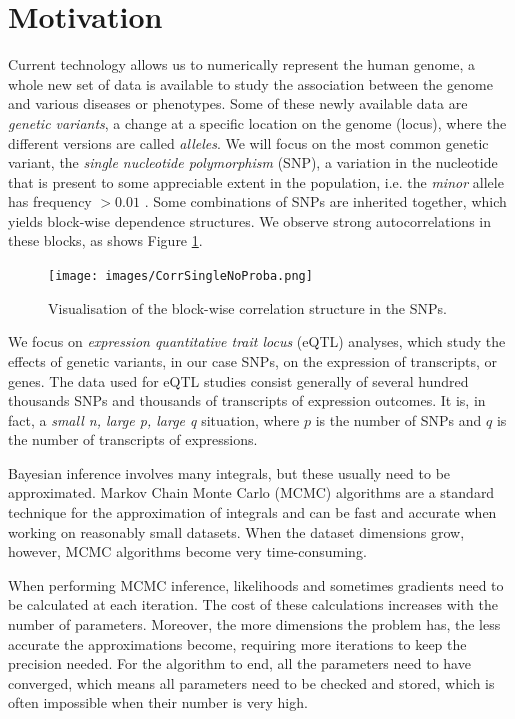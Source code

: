 \documentclass[a4paper, 11pt]{report}
\numberwithin{equation}{section}
\begin{document}
\section{Motivation}
Current technology allows us to numerically represent the human genome, a whole new set of data is available to study the association between the genome and various diseases or phenotypes.  Some of these newly available data are \textit{genetic variants}, a change at a specific location on  the genome (locus), where the different versions are called \textit{alleles}. We will focus on the most common genetic variant, the \textit{single nucleotide polymorphism} (SNP), a variation in the nucleotide that is present to some appreciable extent in the population, i.e. the \textit{minor} allele has frequency $> 0.01$ \cite{lewin}. Some combinations of SNPs are inherited together, which yields block-wise dependence structures. We observe strong autocorrelations in these blocks, as shows Figure \ref{fig:corr}.
\begin{figure}
\begin{center}
\texttt{[image: images/CorrSingleNoProba.png]}
\caption{\label{fig:corr} Visualisation of the block-wise correlation structure in the SNPs.}
\end{center}
\end{figure}

We focus on \textit{expression quantitative trait locus} (eQTL) analyses, which study the effects of genetic variants, in our case SNPs, on the expression of transcripts, or genes. The data used for eQTL studies consist generally of several hundred thousands SNPs and thousands of transcripts of expression outcomes. It is, in fact, a \textit{small n, large p, large q} situation, where $p$ is the number of SNPs and $q$ is the number of transcripts of expressions.

Bayesian inference involves many integrals, but these usually need to be approximated. Markov Chain Monte Carlo (MCMC) algorithms are a standard technique for the approximation of integrals and can be fast and accurate when working on reasonably small datasets. When the dataset dimensions grow, however, MCMC algorithms become very time-consuming.

When performing MCMC inference, likelihoods and sometimes gradients need to be calculated at each iteration. The cost of these calculations increases with the number of parameters. Moreover, the more dimensions the problem has, the less accurate the approximations become, requiring more iterations to keep the precision needed. For the algorithm to end, all the parameters need to have converged, which means all parameters need to be checked and stored, which is often impossible when their number is very high.
\end{document}
